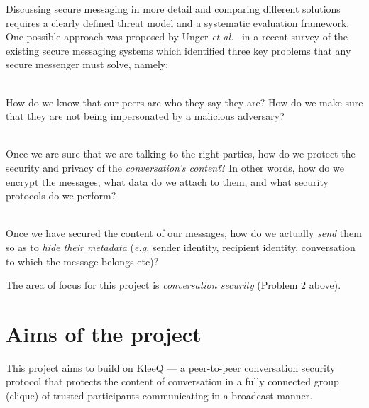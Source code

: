 \documentclass[a4paper, 12pt]{report}
\begin{document}
Discussing secure messaging in more detail and comparing different solutions requires a clearly defined threat model and a systematic evaluation framework. One possible approach was proposed by Unger \textit{et al.}~\cite{unger2015sok} in a recent survey of the existing secure messaging systems which identified three key problems that any secure messenger must solve, namely:


\begin{description}[labelindent=0.5cm, leftmargin=1.3cm, rightmargin=0.5cm]
    \item[Problem 1: Trust Establishment]\hfill \\
        How do we know that our peers are who they say they are? How do we make sure that they are not being impersonated by a malicious adversary?
    \item[Problem 2: Conversation Security]\hfill \\
        Once we are sure that we are talking to the right parties, how do we protect the security and privacy of the \emph{conversation's content}? In other words, how do we encrypt the messages, what data do we attach to them, and what security protocols do we perform?
    \item[Problem 3: Transport Privacy]\hfill \\
        Once we have secured the content of our messages, how do we actually \emph{send} them so as to \emph{hide their metadata} (\textit{e.g.} sender identity, recipient identity, conversation to which the message belongs etc)?
\end{description}
The area of focus for this project is \emph{conversation security} (Problem 2 above).

\section{Aims of the project}
\label{sec:intro.aims}
This project aims to build on KleeQ \cite{reardon2007kleeq} --- a peer-to-peer conversation security protocol that protects the content of conversation in a fully connected group (clique) of trusted participants communicating in a broadcast manner. \\
\end{document}
